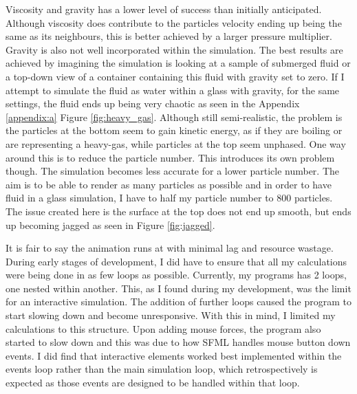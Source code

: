 \documentclass[write-up.tex]{subfiles}
\begin{document}
Viscosity and gravity has a lower level of success than initially anticipated. Although viscosity does contribute to the particles velocity ending up being the same as its neighbours, this is better achieved by a larger pressure multiplier. Gravity is also not well incorporated within the simulation. The best results are achieved by imagining the simulation is looking at a sample of submerged fluid or a top-down view of a container containing this fluid with gravity set to zero. If I attempt to simulate the fluid as water within a glass with gravity, for the same settings, the fluid ends up being very chaotic as seen in the Appendix \ref{appendix:a} Figure \ref{fig:heavy_gas}. Although still semi-realistic, the problem is the particles at the bottom seem to gain kinetic energy, as if they are boiling or are representing a heavy-gas, while particles at the top seem unphased. One way around this is to reduce the particle number. This introduces its own problem though. The simulation becomes less accurate for a lower particle number. The aim is to be able to render as many particles as possible and in order to have fluid in a glass simulation, I have to half my particle number to 800 particles. The issue created here is the surface at the top does not end up smooth, but ends up becoming jagged as seen in Figure \ref{fig:jagged}.

It is fair to say the animation runs at with minimal lag and resource wastage. During early stages of development, I did have to ensure that all my calculations were being done in as few loops as possible. Currently, my programs has 2 loops, one nested within another. This, as I found during my development, was the limit for an interactive simulation. The addition of further loops caused the program to start slowing down and become unresponsive. With this in mind, I limited my calculations to this structure. Upon adding mouse forces, the program also started to slow down and this was due to how SFML handles mouse button down events. I did find that interactive elements worked best implemented within the events loop rather than the main simulation loop, which retrospectively is expected as those events are designed to be handled within that loop.
\end{document}

